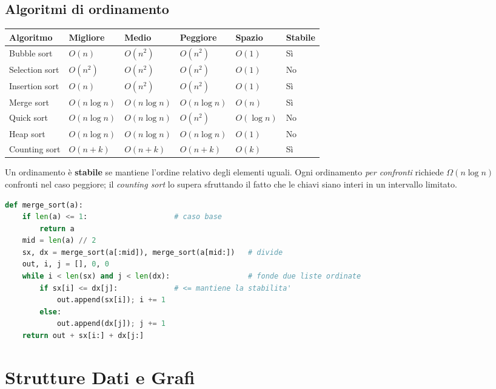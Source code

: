 \subsection{Algoritmi di ordinamento}
\begin{center}
\small
\begin{tabularx}{\textwidth}{@{}>{\raggedright\arraybackslash}p{2.2cm}lllll@{}}
\toprule
\textbf{Algoritmo} & \textbf{Migliore} & \textbf{Medio} & \textbf{Peggiore} & \textbf{Spazio} & \textbf{Stabile} \\
\midrule
Bubble sort & $O(n)$ & $O(n^2)$ & $O(n^2)$ & $O(1)$ & Sì \\
Selection sort & $O(n^2)$ & $O(n^2)$ & $O(n^2)$ & $O(1)$ & No \\
Insertion sort & $O(n)$ & $O(n^2)$ & $O(n^2)$ & $O(1)$ & Sì \\
Merge sort & $O(n\log n)$ & $O(n\log n)$ & $O(n\log n)$ & $O(n)$ & Sì \\
Quick sort & $O(n\log n)$ & $O(n\log n)$ & $O(n^2)$ & $O(\log n)$ & No \\
Heap sort & $O(n\log n)$ & $O(n\log n)$ & $O(n\log n)$ & $O(1)$ & No \\
Counting sort & $O(n+k)$ & $O(n+k)$ & $O(n+k)$ & $O(k)$ & Sì \\
\bottomrule
\end{tabularx}
\end{center}
Un ordinamento è \textbf{stabile} se mantiene l'ordine relativo degli elementi uguali. Ogni ordinamento \emph{per confronti} richiede $\Omega(n\log n)$ confronti nel caso peggiore; il \emph{counting sort} lo supera sfruttando il fatto che le chiavi siano interi in un intervallo limitato.

\begin{lstlisting}[language=Python, caption={Merge sort (divide et impera)}]
def merge_sort(a):
    if len(a) <= 1:                    # caso base
        return a
    mid = len(a) // 2
    sx, dx = merge_sort(a[:mid]), merge_sort(a[mid:])   # divide
    out, i, j = [], 0, 0
    while i < len(sx) and j < len(dx):                  # fonde due liste ordinate
        if sx[i] <= dx[j]:             # <= mantiene la stabilita'
            out.append(sx[i]); i += 1
        else:
            out.append(dx[j]); j += 1
    return out + sx[i:] + dx[j:]
\end{lstlisting}

\section{Strutture Dati e Grafi}

